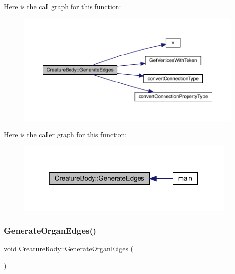 Here is the call graph for this function\+:
\nopagebreak
\begin{figure}[H]
\begin{center}
\leavevmode
\includegraphics[width=350pt]{da/d7d/class_creature_body_a8feda2cfc35e1b76730a31eb368ffed6_cgraph}
\end{center}
\end{figure}
Here is the caller graph for this function\+:
\nopagebreak
\begin{figure}[H]
\begin{center}
\leavevmode
\includegraphics[width=307pt]{da/d7d/class_creature_body_a8feda2cfc35e1b76730a31eb368ffed6_icgraph}
\end{center}
\end{figure}
\mbox{\label{class_creature_body_af1303a40606bf06aed980f14e7027d54}} 
\subsubsection{\texorpdfstring{Generate\+Organ\+Edges()}{GenerateOrganEdges()}}
{\footnotesize\ttfamily void Creature\+Body\+::\+Generate\+Organ\+Edges (\begin{DoxyParamCaption}{ }\end{DoxyParamCaption})}

